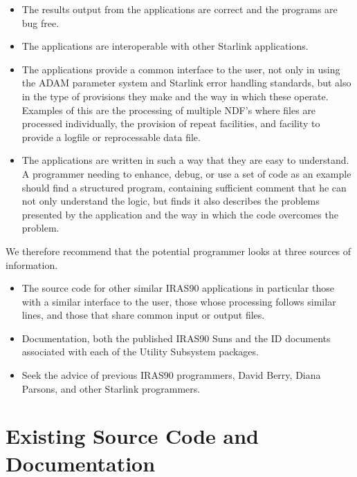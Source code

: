 \begin{itemize}

\item The results output from the applications are correct and the programs are
bug free.

\item The applications are interoperable with other Starlink applications.

\item The applications provide a common interface to the user, not only in
using the ADAM parameter system and Starlink error handling standards, but
also in the type of provisions they make and the way in which these operate.
Examples of this are the processing of multiple NDF's where files are
processed individually, the provision of repeat facilities, and facility
to provide a logfile or reprocessable data file.

\item The applications are written in such a way that they are easy to
understand. A programmer needing to enhance, debug, or use a set of code as an
example should find a structured program, containing sufficient comment that
he can not only understand the logic, but finds it also describes the problems 
presented by the application and the way in which the code overcomes the 
problem.

\end{itemize}

We therefore recommend that the potential programmer looks at three sources of
information.

\begin{itemize}

\item The source code for other similar  {\small IRAS90} applications in
particular those with a similar interface to the user, those whose processing
follows similar lines, and those that share common input or output files.

\item Documentation, both the published {\small IRAS90} Suns and the ID
documents associated with each of the Utility Subsystem packages.

\item Seek the advice of previous {\small IRAS90} programmers, David Berry,
Diana Parsons, and other Starlink programmers.

\end{itemize}

\section{Existing Source Code and Documentation}

